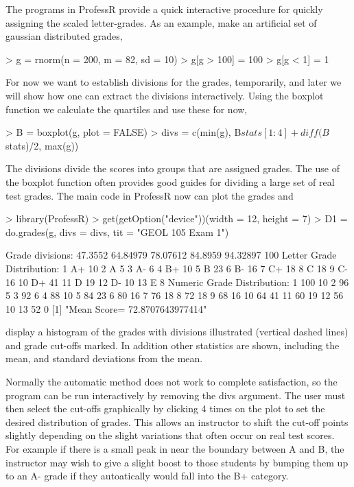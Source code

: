 \documentclass{article}
\begin{document}
The programs in ProfessR provide a quick interactive 
procedure for quickly assigning the scaled letter-grades.
As an example,  make an artificial set of gaussian distributed grades,
\begin{Schunk}
\begin{Sinput}
> g = rnorm(n = 200, m = 82, sd = 10)
> g[g > 100] = 100
> g[g < 1] = 1
\end{Sinput}
\end{Schunk}

For now we want to establish divisions for
the grades, temporarily, and later we will show how
one can extract the divisions interactively.
Using the boxplot function we calculate the quartiles
and use these for now,
\begin{Schunk}
\begin{Sinput}
> B = boxplot(g, plot = FALSE)
> divs = c(min(g), B$stats[1:4] + diff(B$stats)/2, max(g))
\end{Sinput}
\end{Schunk}
The divisions divide the scores
into groups that are assigned grades.
The use of the boxplot function often provides good 
guides for dividing a large set of 
real test grades.
The main code in ProfessR now can plot the grades and
\begin{Schunk}
\begin{Sinput}
> library(ProfessR)
> get(getOption("device"))(width = 12, height = 7)
> D1 = do.grades(g, divs = divs, tit = "GEOL 105 Exam 1")
\end{Sinput}
\begin{Soutput}
Grade divisions:
47.3552
64.84979
78.07612
84.8959
94.32897
100
Letter Grade Distribution:
1 A+ 10
2 A 5
3 A- 6
4 B+ 10
5 B 23
6 B- 16
7 C+ 18
8 C 18
9 C- 16
10 D+ 41
11 D 19
12 D- 10
13 E 8
Numeric Grade Distribution:
1 100 10
2 96 5
3 92 6
4 88 10
5 84 23
6 80 16
7 76 18
8 72 18
9 68 16
10 64 41
11 60 19
12 56 10
13 52 0
[1] "Mean Score= 72.8707643977414"
\end{Soutput}
\end{Schunk}
display a histogram of the grades with divisions
illustrated (vertical dashed lines)  and grade  cut-offs marked.
In addition other statistics are shown, including the mean,
and standard deviations from the mean.

Normally the automatic method does not work to complete satisfaction,
so the program can be run interactively by 
removing the  divs argument.
The user must then
select the cut-offs graphically by clicking 4 times on the
plot to set  the desired distribution of grades.
This allows an instructor to shift the
cut-off points slightly depending on
the slight variations that often occur on real test scores.
For example if there is 
a small peak in near the boundary between A and B,
the instructor may wish to give a slight boost
to those students by bumping them up to an A- grade
if they autoatically would fall into the B+ category.
\end{document}
